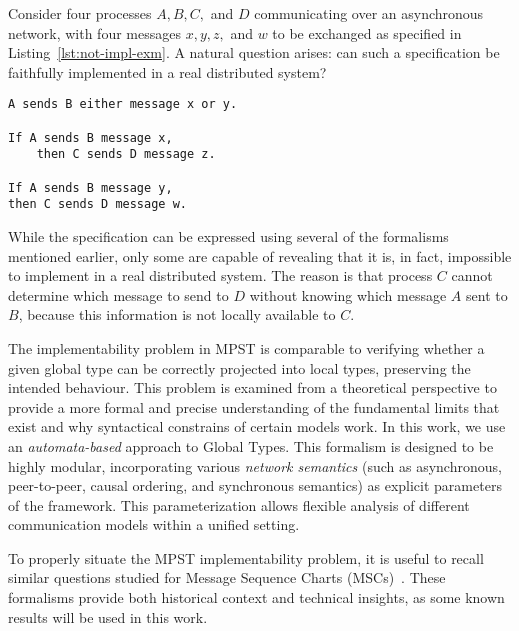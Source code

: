 \begin{example}
Consider four processes $A, B, C,$ and $D$ communicating over an
asynchronous network, with four messages $x, y, z,$ and $w$ to be
exchanged as specified in Listing~\ref{lst:not-impl-exm}. A natural
question arises: can such a specification be faithfully implemented in a
real distributed system?

\bigskip

\begin{lstlisting}[caption={Example specification of message exchanges},
                   label={lst:not-impl-exm},
                   keywordstyle=\color{blue}\bfseries,morekeywords={sends,If,then}]
A sends B either message x or y.

If A sends B message x,
    then C sends D message z.

If A sends B message y,
then C sends D message w.
\end{lstlisting}

While the specification can be expressed using several of the
formalisms mentioned earlier, only some are capable of revealing that
it is, in fact, impossible to implement in a real distributed system.
The reason is that process $C$ cannot determine which message to send
to $D$ without knowing which message $A$ sent to $B$, because this 
information is not locally available to $C$.
\end{example}

The implementability problem in MPST is comparable to verifying 
whether a given global type can be correctly projected into local 
types, preserving the intended behaviour.
This problem is examined from a theoretical
perspective to provide a more formal and precise understanding of
the fundamental limits that exist and why syntactical constrains
of certain models work.
In this work, we use an \textit{automata-based} approach to Global Types. 
This formalism is designed to be highly modular, 
incorporating various \textit{network semantics} (such as asynchronous, 
peer-to-peer, causal ordering, and synchronous semantics) as explicit 
parameters of the framework. This parameterization allows flexible 
analysis of different communication models within a unified setting.

To properly situate the MPST implementability problem, it is useful to
recall similar questions studied for Message Sequence Charts 
(MSCs)~\cite{alur2000inference,alur2003inference}.
These formalisms provide both historical context and technical insights, 
as some known results will be used in this work.

